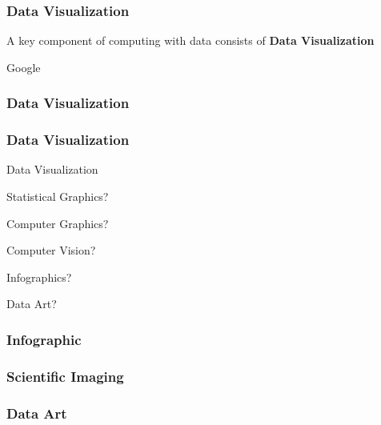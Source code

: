 \documentclass[12pt]{beamer}\usepackage[]{graphicx}\usepackage[]{color}
\begin{document}

\begin{frame}
\frametitle{Data Visualization}

A key component of computing with data consists of \textbf{Data Visualization}

\bigskip
Google 

\end{frame}


\begin{frame}
\frametitle{Data Visualization}
\begin{center}
\end{center}
\end{frame}


\begin{frame}
\frametitle{Data Visualization}

Data Visualization
\bi
  \item Statistical Graphics?
  \item Computer Graphics?
  \item Computer Vision?
  \item Infographics?
  \item Data Art?
\ei

\end{frame}


\begin{frame}
\frametitle{Infographic}
\begin{center}
\end{center}
\end{frame}


\begin{frame}
\frametitle{Scientific Imaging}
\begin{center}
\end{center}
\end{frame}


\begin{frame}
\frametitle{Data Art}
\begin{center}
\end{center}
\end{frame}
\end{document}
